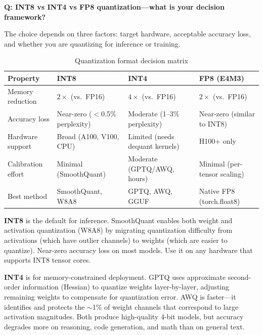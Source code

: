 \begin{interviewq}
\textbf{Q: INT8 vs INT4 vs FP8 quantization---what is your decision framework?}

 \quad {} \quad \badgefreq{\freqhigh}

\stronganswer

The choice depends on three factors: target hardware, acceptable accuracy loss, and whether you are quantizing for inference or training.

\begin{table}[H]
\centering
\caption{Quantization format decision matrix}
\begin{tabularx}{\textwidth}{lXXX}
\toprule
\textbf{Property} & \textbf{INT8} & \textbf{INT4} & \textbf{FP8 (E4M3)} \\
\midrule
Memory reduction & $2\times$ (vs.\ FP16) & $4\times$ (vs.\ FP16) & $2\times$ (vs.\ FP16) \\
Accuracy loss & Near-zero ($<$0.5\% perplexity) & Moderate (1--3\% perplexity) & Near-zero (similar to INT8) \\
Hardware support & Broad (A100, V100, CPU) & Limited (needs dequant kernels) & H100+ only \\
Calibration effort & Minimal (SmoothQuant) & Moderate (GPTQ/AWQ, hours) & Minimal (per-tensor scaling) \\
Best method & SmoothQuant, W8A8 & GPTQ, AWQ, GGUF & Native FP8 (torch.float8) \\
\bottomrule
\end{tabularx}
\end{table}

\textbf{INT8} is the default for inference. SmoothQuant enables both weight and activation quantization (W8A8) by migrating quantization difficulty from activations (which have outlier channels) to weights (which are easier to quantize). Near-zero accuracy loss on most models. Use it on any hardware that supports INT8 tensor cores.

\textbf{INT4} is for memory-constrained deployment. GPTQ uses approximate second-order information (Hessian) to quantize weights layer-by-layer, adjusting remaining weights to compensate for quantization error. AWQ is faster---it identifies and protects the $\sim$1\% of weight channels that correspond to large activation magnitudes. Both produce high-quality 4-bit models, but accuracy degrades more on reasoning, code generation, and math than on general text.


\end{interviewq}
